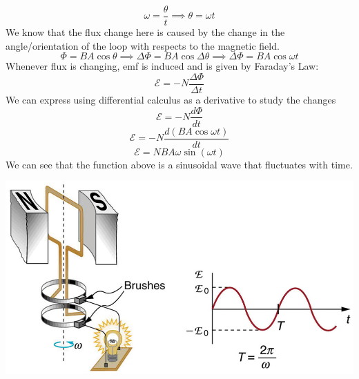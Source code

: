 \documentclass[9pt]{article}
\begin{document}
	$$\omega=\dfrac{\theta}{t}\implies\theta=\omega t$$
	We know that the flux change here is caused by the change in the angle/orientation of the loop with respects to the magnetic field. 
	$$\Phi=BA\cos\theta\implies\Delta\Phi=BA\cos\Delta\theta\implies\Delta\Phi=BA\cos\omega t$$
	Whenever flux is changing, emf is induced and is given by Faraday's Law:
	$$\mathcal{E}=-N\dfrac{\Delta\Phi}{\Delta t}$$
	We can express using differential calculus as a derivative to study the changes
	$$\mathcal{E}=-N\dfrac{d\Phi}{dt}$$
	$$\mathcal{E}=-N\dfrac{d(BA\cos\omega t)}{dt}$$
	$$\mathcal{E}=NBA\omega\sin(\omega t)$$
	We can see that the function above is a sinusoidal wave that fluctuates with time.
	\begin{center}
		\includegraphics[scale=0.5]{ac.jpg}
	\end{center} 
\end{document}
